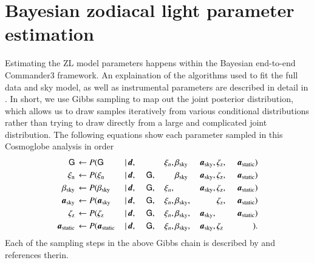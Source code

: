 \documentclass[twocolumn]{aa}
\renewcommand{\a}[0]{\vec{a}}
\newcommand{\dv}[0]{\vec{d}}
\newcommand{\G}[0]{\tens{G}}
\renewcommand{\a}[0]{\vec{a}}
\begin{document}
\section{Bayesian zodiacal light parameter estimation}\label{sect:param-estimation}
Estimating the ZL model parameters happens within the Bayesian end-to-end Commander3 framework. An explaination of the algorithms used to fit the full data and sky model, as well as instrumental parameters are described in detail in \cite{CG02_01}. In short, we use Gibbs sampling to map out the joint posterior distribution\citep{Galloway2023}, which allows us to draw samples iteratively from various conditional distributions rather than trying to draw directly from a large and complicated joint distribution. The following equations show each parameter sampled in this Cosmoglobe analysis in order
\begin{alignat}{11}
    \G &\,\leftarrow P(\G&\,\mid &\,\dv,&\, &\,\phantom{\G} &\,\xi_n, &
    \,\beta_{\mathrm{sky}}& \,\a_{\mathrm{sky}}, &\,\zeta_{\mathrm{z}},
    &\,\a_{\mathrm{static}})\label{eq:gibbs_G}\\
    \xi_{\mathrm{n}} &\,\leftarrow P(\xi_{\mathrm{n}}&\,\mid &\,\dv,&\, &\,\G, &\,\phantom{\xi_n} &
    \,\beta_{\mathrm{sky}}& \,\a_{\mathrm{sky}}, &\,\zeta_{\mathrm{z}},
    &\,\a_{\mathrm{static}})\\
    \beta_{\mathrm{sky}} &\,\leftarrow P(\beta_{\mathrm{sky}}&\,\mid &\,\dv,&\, &\,\G, &\,\xi_n, &
    \,\phantom{\beta_{\mathrm{sky}}}& \,\a_{\mathrm{sky}}, &\,\zeta_{\mathrm{z}}, &\,\a_{\mathrm{static}})\\
    \a_{\mathrm{sky}} &\,\leftarrow P(\a_{\mathrm{sky}}&\,\mid &\,\dv,&\, &\,\G, &\,\xi_n, &
    \,\beta_{\mathrm{sky}},& \,\phantom{\a_{\mathrm{sky}},}
    &\,\zeta_{\mathrm{z}}, &\,\a_{\mathrm{static}})\\
    \zeta_{\mathrm{z}} &\,\leftarrow P(\zeta_{\mathrm{z}}&\,\mid &\,\dv,&\, &\,\G, &\,\xi_n, &
    \,\beta_{\mathrm{sky}},& \,\a_{\mathrm{sky}},
    &\,\phantom{\zeta_{\mathrm{z}},} &\,\a_{\mathrm{static}})\label{eq:gibbs_zodi}\\
    \a_{\mathrm{static}} &\,\leftarrow P(\a_{\mathrm{static}}&\,\mid &\,\dv,&\, &\,\G, &\,\xi_n, &
    \,\beta_{\mathrm{sky}},& \,\a_{\mathrm{sky}}, &\,\zeta_{\mathrm{z}} &\,\phantom{\a_{\mathrm{static}}})\label{eq:gibbs_static}.
\end{alignat}
Each of the sampling steps in the above Gibbs chain is described by \citet{CG02_01}
and references therin. 
\end{document}
